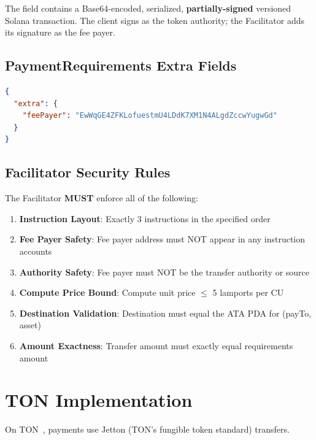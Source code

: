 The  field contains a Base64-encoded, serialized, \textbf{partially-signed} versioned Solana transaction. The client signs as the token authority; the Facilitator adds its signature as the fee payer.

\subsection{PaymentRequirements Extra Fields}

\begin{lstlisting}[language=json,caption={Solana-specific extra fields}]
{
  "extra": {
    "feePayer": "EwWqGE4ZFKLofuestmU4LDdK7XM1N4ALgdZccwYugwGd"
  }
}
\end{lstlisting}

\subsection{Facilitator Security Rules}

\begin{securitybox}
The Facilitator \textbf{MUST} enforce all of the following:

\begin{enumerate}
    \item \textbf{Instruction Layout}: Exactly 3 instructions in the specified order
    \item \textbf{Fee Payer Safety}: Fee payer address must NOT appear in any instruction accounts
    \item \textbf{Authority Safety}: Fee payer must NOT be the transfer authority or source
    \item \textbf{Compute Price Bound}: Compute unit price $\leq$ 5 lamports per CU
    \item \textbf{Destination Validation}: Destination must equal the ATA PDA for (payTo, asset)
    \item \textbf{Amount Exactness}: Transfer amount must exactly equal requirements amount
\end{enumerate}
\end{securitybox}

\section{TON Implementation}
\label{sec:ton-implementation}

On TON~\cite{ton}, payments use Jetton (TON's fungible token standard) transfers.

